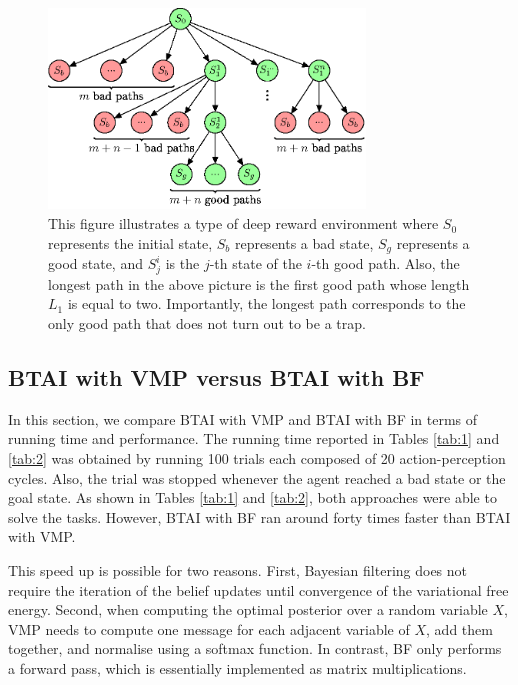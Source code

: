 \documentclass[twoside,11pt]{article}
\begin{document}
\begin{figure}[H]
	\begin{center}
	\includegraphics[width=0.75\textwidth]{BTAI_BF-figure1.eps}
 	\end{center}
\vspace{-0.25cm}
    \caption{
This figure illustrates a type of deep reward environment where $S_0$ represents the initial state, $S_b$ represents a bad state, $S_g$ represents a good state, and $S^i_j$ is the $j$-th state of the $i$-th good path. Also, the longest path in the above picture is the first good path whose length $L_1$ is equal to two. Importantly, the longest path corresponds to the only good path that does not turn out to be a trap.}
    \label{fig:graph_env}
\end{figure}

\subsection{BTAI with VMP versus BTAI with BF}

In this section, we compare BTAI with VMP and BTAI with BF in terms of running time and performance. The running time reported in Tables \ref{tab:1} and \ref{tab:2} was obtained by running 100 trials each composed of 20 action-perception cycles. Also, the trial was stopped whenever the agent reached a bad state or the goal state. As shown in Tables \ref{tab:1} and \ref{tab:2}, both approaches were able to solve the tasks. However, BTAI with BF ran around forty times faster than BTAI with VMP.

This speed up is possible for two reasons. First, Bayesian filtering does not require the iteration of the belief updates until convergence of the variational free energy. Second, when computing the optimal posterior over a random variable $X$, VMP needs to compute one message for each adjacent variable of $X$, add them together, and normalise using a softmax function. In contrast, BF only performs a forward pass, which is essentially implemented as matrix multiplications. 
\end{document}
